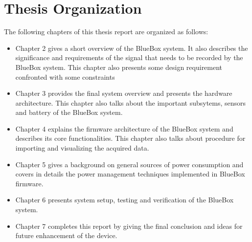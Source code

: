\section{Thesis Organization}
The following chapters of this thesis report are organized as follows:
\begin{itemize}
	\item Chapter 2 gives a short overview of the BlueBox system. It also describes the significance and requirements of the signal that needs to be recorded by the BlueBox system. This chapter also presents some design requirement confronted with some constraints
	
	\item Chapter 3 provides the final system overview and presents the hardware architecture. This chapter also talks about the important subsytems, sensors and battery of the BlueBox system.
	
	\item Chapter 4 explains the firmware architecture of the BlueBox system and describes its core functionalities. This chapter also talks about procedure for importing and visualizing the acquired data.
	
	\item Chapter 5 gives a background on general sources of power consumption and covers in details the power management techniques implemented in BlueBox firmware.
	
	\item Chapter 6 presents system setup, testing and verification of the BlueBox system. 
	
	\item
	Chapter 7 completes this report by giving the final conclusion and ideas for future enhancement of the device.
	
\end{itemize}

